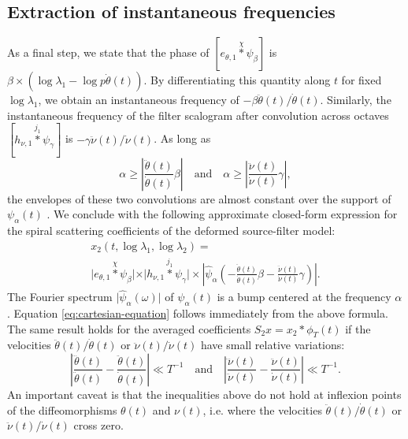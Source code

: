 \documentclass[twoside,a4paper]{article}
\begin{document}
\subsection{Extraction of instantaneous frequencies}
As a final step, we state that the phase of $[ e_{\theta,1} \overset{\chi}{\ast} \psi_{\beta} ]$ is $\beta\times(\log \lambda_1 - \log p \dot{\theta}(t))$. By differentiating this quantity along $t$ for fixed $\log \lambda_1$, we obtain an instantaneous frequency of $- \beta \ddot{\theta}(t)/\dot{\theta}(t)$. Similarly, the instantaneous frequency of the filter scalogram after convolution across octaves $[h_{\nu,1} \overset{j_{1}}{\ast} \psi_{\gamma}]$ is $ - \gamma \ddot{\nu}(t)/\dot{\nu}(t)$. As long as
\begin{equation}
\alpha \geq \left \vert \frac{\ddot{\theta}(t)}{\dot{\theta}(t)} \beta \right \vert
\quad
\text{and}
\quad
\alpha \geq \left \vert \frac{\ddot{\nu}(t)}{\dot{\nu}(t)} \gamma \right \vert,
\end{equation}
the envelopes of these two convolutions are almost constant over the support of $\psi_{\alpha}(t)$ \cite{Delprat1992}. We conclude with the following approximate closed-form expression for the spiral scattering coefficients of the deformed source-filter model:
\begin{multline}
x_2(t,\log \lambda_1, \log \lambda_2) = \\
\vert e_{\theta,1} \overset{\chi}{\ast} \psi_\beta \vert \times
\vert h_{\nu,1} \overset{j_{1}}{\ast} \psi_\gamma \vert \times
\left \vert \widehat{\psi}_{\alpha} \left( -\frac{\ddot{\theta}(t)}{\dot{\theta}(t)} \beta - \frac{\ddot{\nu}(t)}{\dot{\nu}(t)} \gamma \right) \right \vert.
\label{eq:x2-sourcefilter}
\end{multline}
The Fourier spectrum $\vert \widehat{\psi}_\alpha(\omega) \vert$ of $\psi_\alpha(t)$ is a bump centered at the frequency $\alpha$. Equation \ref{eq:cartesian-equation} follows immediately from the above formula. The same result holds for the averaged coefficients $S_2 x = x_2 \ast \phi_T (t)$ if the velocities $\ddot{\theta}(t)/\dot{\theta}(t)$ or $\ddot{\nu}(t)/\dot{\nu}(t)$ have small relative variations:
\begin{equation}
\left \vert \frac{\dddot{\theta}(t)}{\ddot{\theta}(t)} - \frac{\ddot{\theta}(t)}{\dot{\theta}(t)} \right \vert \ll T^{-1}
\quad \text{and} \quad
\left \vert \frac{\dddot{\nu}(t)}{\ddot{\nu}(t)} - \frac{\ddot{\nu}(t)}{\dot{\nu}(t)} \right \vert \ll T^{-1}.
\end{equation}
An important caveat is that the inequalities above do not hold at inflexion points of the diffeomorphisms $\theta(t)$ and $\nu(t)$, i.e. where the velocities $\ddot{\theta}(t)/\dot{\theta}(t)$ or $\ddot{\nu}(t)/\dot{\nu}(t)$ cross zero.
\end{document}
